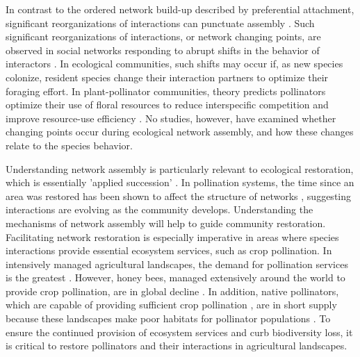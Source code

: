 \documentclass[12pt]{article}
\begin{document}
In contrast to the ordered network build-up described by preferential
attachment, significant reorganizations of interactions can punctuate
assembly \citep{peel2014detecting}. Such significant reorganizations
of interactions, or network changing points, are observed in social
networks responding to abrupt shifts in the behavior of interactors
\citep{peel2014detecting}.  In ecological communities, such shifts may
occur if, as new species colonize, resident species change their
interaction partners to optimize their foraging effort. In
plant-pollinator communities, theory predicts pollinators optimize
their use of floral resources to reduce interspecific competition and
improve resource-use efficiency \citep{pyke1984optimal,
  valdovinos2010consequences, valdovinos2013adaptive,
  albrecht2010plant, Bluthgen2007}. No studies, however, have examined
whether changing points occur during ecological network assembly, and
how these changes relate to the species behavior.

Understanding network assembly is particularly relevant to ecological
restoration, which is essentially 'applied succession'
\citep[e.g.,][]{parker1997scale}. In pollination systems, the time
since an area was restored has been shown to affect the structure of
networks \citep{forup-2008-742, forup2008restoration,
  devoto2012understanding}, suggesting interactions are evolving as
the community develops. Understanding the mechanisms of network
assembly will help to guide community restoration. Facilitating
network restoration is especially imperative in areas where species
interactions provide essential ecosystem services, such as crop
pollination. In intensively managed agricultural landscapes, the
demand for pollination services is the greatest
\citep{kremen-2008-10}. However, honey bees, managed extensively
around the world to provide crop pollination, are in global decline
\citep{neumann-2010-1, van-engelsdorp-2009-e6481}. In addition, native
pollinators, which are capable of providing sufficient crop
pollination \citep{kremen-2002-16816, winfree-2007-1105,
  kremen-2004-1109}, are in short supply because these landscapes make
poor habitats for pollinator populations \citep{kremen-2002-16816}. To
ensure the continued provision of ecosystem services and curb
biodiversity loss, it is critical to restore pollinators and their
interactions in agricultural landscapes.
\end{document}

